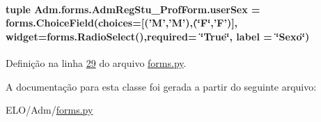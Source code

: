 \hypertarget{classAdm_1_1forms_1_1AdmRegStu__ProfForm_af8e16ffbc31dfdec8496b7751bb51bed}{
\paragraph[{user\-Sex}]{\setlength{\rightskip}{0pt plus 5cm}tuple Adm.\-forms.\-Adm\-Reg\-Stu\-\_\-\-Prof\-Form.\-user\-Sex = forms.\-Choice\-Field(choices=\mbox{[}('M','M'),(\char`\"{}F\char`\"{},'F')\mbox{]}, widget=forms.\-Radio\-Select(),required= \char`\"{}True\char`\"{}, label = \char`\"{}Sexo\char`\"{})\hspace{0.3cm}{\ttfamily [static]}}}\label{classAdm_1_1forms_1_1AdmRegStu__ProfForm_af8e16ffbc31dfdec8496b7751bb51bed}


Definição na linha \hyperlink{Adm_2forms_8py_source_l00029}{29} do arquivo \hyperlink{Adm_2forms_8py_source}{forms.\-py}.



A documentação para esta classe foi gerada a partir do seguinte arquivo\-:\begin{DoxyCompactItemize}
\item 
E\-L\-O/\-Adm/\hyperlink{Adm_2forms_8py}{forms.\-py}\end{DoxyCompactItemize}
